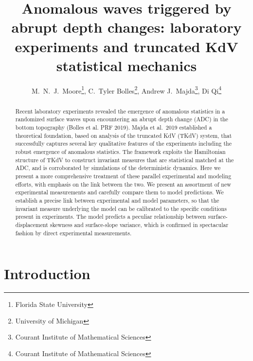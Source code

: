 \documentclass[11pt]{article}
\begin{document}
\title{Anomalous waves triggered by abrupt depth changes: laboratory experiments and truncated KdV statistical mechanics}


\author{
M.~N.~J.~Moore\thanks{Florida State University}, 
C.~Tyler Bolles\thanks{University of Michigan},
Andrew J.~Majda\thanks{Courant Institute of Mathematical Sciences}, 
Di Qi\thanks{Courant Institute of Mathematical Sciences} }
\maketitle

\begin{abstract} 
Recent laboratory experiments revealed the emergence of anomalous statistics in a randomized surface waves upon encountering an abrupt depth change (ADC) in the bottom topography (Bolles et al. PRF 2019). Majda et al.~2019 established a theoretical foundation, based on analysis of the truncated KdV (TKdV) system, that successfully captures several key qualitative features of the experiments including the robust emergence of anomalous statistics. The framework exploits the Hamiltonian structure of TKdV to construct invariant measures that are statistical matched at the ADC, and is corroborated by simulations of the deterministic dynamics. 
%
Here we present a more comprehensive treatment of these parallel experimental and modeling efforts, with emphasis on the link between the two. We present an assortment of new experimental measurements and carefully compare them to model predictions. We establish a precise link between experimental and model parameters, so that the invariant measure underlying the model can be calibrated to the specific conditions present in experiments. The model predicts a peculiar relationship between surface-displacement skewness and surface-slope variance, which is confirmed in spectacular fashion by direct experimental measurements.
\end{abstract}


\section{Introduction}
\end{document}
